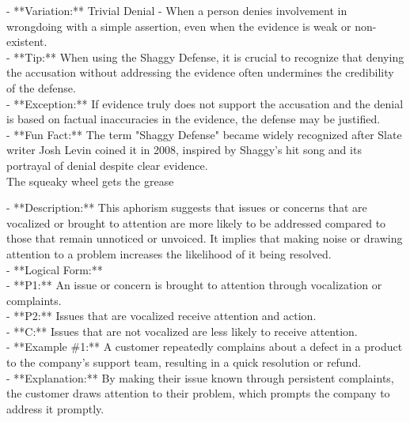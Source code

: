 \documentclass[a4paper,12pt,single,pdftex]{scrartcl}
\begin{document}
    
      - **Variation:** Trivial Denial - When a person denies involvement in wrongdoing with a simple assertion, even when the evidence is weak or non-existent.
    \\

    
      - **Tip:** When using the Shaggy Defense, it is crucial to recognize that denying the accusation without addressing the evidence often undermines the credibility of the defense.
    \\

    
      - **Exception:** If evidence truly does not support the accusation and the denial is based on factual inaccuracies in the evidence, the defense may be justified.
    \\

    
      - **Fun Fact:** The term "Shaggy Defense" became widely recognized after Slate writer Josh Levin coined it in 2008, inspired by Shaggy's hit song and its portrayal of denial despite clear evidence.
    \\

  

The squeaky wheel gets the grease
    
      - **Description:** This aphorism suggests that issues or concerns that are vocalized or brought to attention are more likely to be addressed compared to those that remain unnoticed or unvoiced. It implies that making noise or drawing attention to a problem increases the likelihood of it being resolved.
    \\

    
      - **Logical Form:**
    \\

    
        - **P1:** An issue or concern is brought to attention through vocalization or complaints.
    \\

    
        - **P2:** Issues that are vocalized receive attention and action.
    \\

    
        - **C:** Issues that are not vocalized are less likely to receive attention.
    \\

    
      - **Example \#1:** A customer repeatedly complains about a defect in a product to the company’s support team, resulting in a quick resolution or refund.
    \\

    
      - **Explanation:** By making their issue known through persistent complaints, the customer draws attention to their problem, which prompts the company to address it promptly.
    \\
\end{document}
